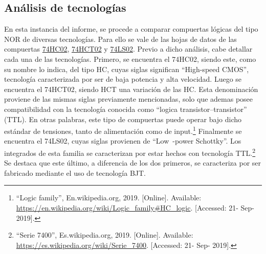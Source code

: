 



\subsection{Análisis de tecnologías}

En esta instancia del informe, se procede a comparar compuertas lógicas del tipo NOR de diversas tecnologías. Para ello se vale de las hojas de datos de las compuertas \href{http://www.ti.com/lit/ds/symlink/sn74hc02.pdf}{74HC02}, \href{http://www.ti.com/lit/ds/symlink/sn74hct02.pdf}{74HCT02} y \href{http://www.ti.com/lit/ds/symlink/sn74ls02.pdf}{74LS02}. Previo a dicho análisis, cabe detallar cada una de las tecnologías. Primero, se encuentra el 74HC02, siendo este, como su nombre lo indica, del tipo HC, cuyas siglas significan ``High-speed CMOS'', tecnología caracterizada por ser de baja potencia y alta velocidad. Luego se encuentra el 74HCT02, siendo HCT una variación de las HC. Esta denominación proviene de las mismas siglas previamente mencionadas, solo que ademas posee compatibilidad con la tecnología conocida como ``logica transistor–transistor'' (TTL). En otras palabras, este tipo de compuertas puede operar bajo dicho estándar de tensiones, tanto de alimentación como de input.\footnote{``Logic family'', En.wikipedia.org, 2019. [Online]. Available: \url{https://en.wikipedia.org/wiki/Logic\_family\#HC\_logic}. [Accessed: 21- Sep- 2019].} Finalmente se encuentra el 74LS02, cuyas siglas provienen de ``Low~-power Schottky''. Los integrados de esta familia se caracterizan por estar hechos con tecnología TTL.\footnote{``Serie 7400'', Es.wikipedia.org, 2019. [Online]. Available: \url{https://es.wikipedia.org/wiki/Serie\_7400}. [Accessed: 21- Sep- 2019].} Se destaca que este último, a diferencia de los dos primeros, se caracteriza por ser fabricado mediante el uso de tecnología BJT.

